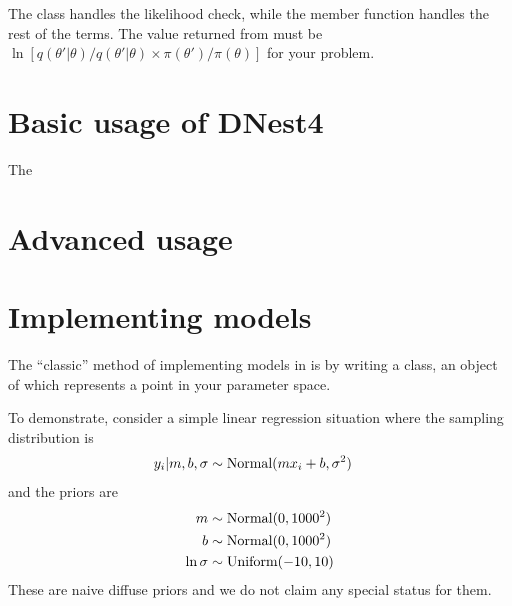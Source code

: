 \documentclass[article]{jss}
\newcommand{\params}{\theta}
\begin{document}
The   class handles the likelihood check,
while the  member function handles the
rest of the terms. The value returned from 
must be
$\ln\left[q(\params'|\params)/q(\params'|\params)\times\pi(\params')/\pi(\params)\right]$ for your problem.






\section{Basic usage of DNest4}
The

\section{Advanced usage}


\section{Implementing models}
The ``classic'' method of implementing models in  is by
writing a  class, an object of which represents a
point in your parameter space.

To demonstrate, consider a simple linear regression situation where the
sampling distribution is
\begin{align}
y_i | m, b, \sigma &\sim \textnormal{Normal}(mx_i + b, \sigma^2)
\end{align}
and the priors are
\begin{align}
m &\sim \textnormal{Normal}(0, 1000^2)\\
b &\sim \textnormal{Normal}(0, 1000^2)\\
\ln\sigma &\sim \textnormal{Uniform}(-10, 10)
\end{align}
These are naive diffuse priors and we do not claim any special status for them.

\end{document}
